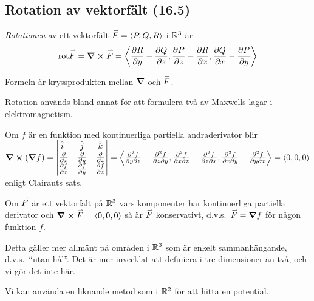 \documentclass[a4paper]{article}
\begin{document}
\providecommand\fname{}
\renewcommand\fname{19-10-18}

\subsection{Rotation av vektorfält (16.5)}
\begin{defn}
    \emph{Rotationen} av ett vektorfält \(
        \accentset{\rightharpoonup}{F} = \left\langle P,Q,R\right\rangle 
    \) i \(
        \mathbb{R}^3
    \) är \[
        \text{rot} \accentset{\rightharpoonup}{F} = \curl{\accentset{\rightharpoonup}{F}} = \left\langle \pdv{R}{y} - \pdv{Q}{z}
                    , \pdv{P}{z} - \pdv{R}{x} 
                    , \pdv{Q}{x} - \pdv{P}{y} \right\rangle
    \] 

    Formeln är kryssprodukten mellan \(
        \grad
    \) och \(
        \accentset{\rightharpoonup}{F}
    \). 
\end{defn}

Rotation används bland annat för att formulera två av Maxwells lagar i 
elektromagnetism. 

\begin{sats}
    Om \(
        f
    \) är en funktion med kontinuerliga partiella andraderivator blir \(
        \curl(\grad{f}) = 
        \begin{vmatrix}
            \uvec{i} & \uvec{j} & \uvec{k} \\ 
            \pdv{x} & \pdv{y} & \pdv{z} \\ 
            \pdv{f}{x} & \pdv{f}{y} & \pdv{f}{z}
        \end{vmatrix}
        = \lang \pdv{f}{y}{z} - \pdv{f}{z}{y}, \pdv{f}{x}{z} - \pdv{f}{z}{x}, \pdv{f}{x}{y} - \pdv{f}{y}{x} \rang
        = \lang 0,0,0\rang
    \) enligt Clairauts sats.
\end{sats}

\begin{sats}
    Om \(
        \accentset{\rightharpoonup}{F}
    \) är ett vektorfält på \(
        \mathbb{R}^3
    \) vars komponenter har kontinuerliga partiella derivator och \(
        \curl{\accentset{\rightharpoonup}{F}} = \left\langle 0,0,0\right\rangle
    \) så är \(
        \accentset{\rightharpoonup}{F}
    \) konservativt, d.v.s.\ \(
        \accentset{\rightharpoonup}{F} = \grad{f}
    \) för någon funktion \(
        f
    \). 

    Detta gäller mer allmänt på områden i \(
        \mathbb{R}^3
    \) som är enkelt sammanhängande, d.v.s.\ \enquote{utan hål}. Det är mer 
    invecklat att definiera i tre dimensioner än två, och vi gör det inte här.
\end{sats}

Vi kan använda en liknande metod som i \(
    \mathbb{R}^2
\) för att hitta en potential.
\end{document}
